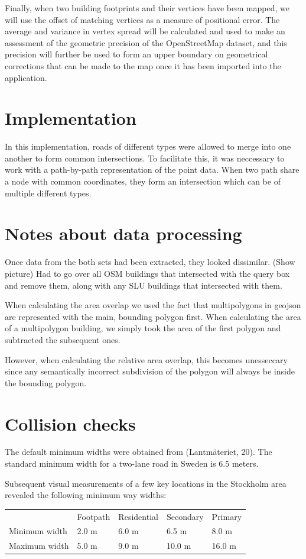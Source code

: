 \documentclass[a4paper]{article}
\begin{document}
Finally, when two building footprints and their vertices have been mapped, we will use the offset of matching vertices as a measure of positional error. The average and variance in vertex spread will be calculated and used to make an assessment of the geometric precision of the OpenStreetMap dataset, and this precision will further be used to form an upper boundary on geometrical corrections that can be made to the map once it has been imported into the application.

\section{Implementation}

In this implementation, roads of different types were allowed to merge into one another to form common intersections. To facilitate this, it was neccessary to work with a path-by-path representation of the point data. When two path share a node with common coordinates, they form an intersection which can be of multiple different types.

\section{Notes about data processing}

Once data from the both sets had been extracted, they looked dissimilar. (Show picture) Had to go over all OSM buildings that intersected with the query box and remove them, along with any SLU buildings that intersected with them.

When calculating the area overlap we used the fact that multipolygons in geojson are represented with the main, bounding polygon first. When calculating the area of a multipolygon building, we simply took the area of the first polygon and subtracted the subsequent ones.

However, when calculating the relative area overlap, this becomes unesseccary since any semantically incorrect subdivision of the polygon will always be inside the bounding polygon.

\section{Collision checks}

The default minimum widths were obtained from (Lantmäteriet, 20). The standard minimum width for a two-lane road in Sweden is 6.5 meters.

Subsequent visual measurements of a few key locations in the Stockholm area revealed the following minimum way widths:
\begin{table}[H]
\begin{tabular}{lllll}
                  & Footpath & Residential & Secondary & Primary \\
    Minimum width & 2.0 m    & 6.0 m       & 6.5 m     & 8.0 m   \\
    Maximum width & 5.0 m    & 9.0 m       & 10.0 m    & 16.0 m
\end{tabular}
\end{table}
\end{document}
